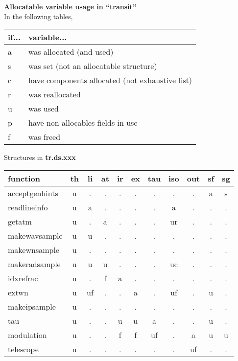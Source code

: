 \documentclass{article}
\begin{document}
\begin{center}
{\large {\bf Allocatable variable usage in ``transit''}}\\
\vfill
In the following tables, \\
\begin{tabular}{ll}
if... & variable...\\
\hline
a & was allocated (and used) \\
s & was set (not an allocatable structure)\\
c & have components allocated (not exhaustive list) \\
r & was reallocated \\
u & was used \\
p & have non-allocables fields in use \\
f & was freed \\
\end{tabular}
\end{center}

\vfill

\begin{center}
{\large Structures in {\bf tr.ds.xxx}}\\[.5cm]
\begin{tabular}{l|cccccccccc}
function
  & th & li & at & ir & ex & tau & iso & out & sf & sg \\
\hline
acceptgenhints
  & u  & .  & .  & .  & .  & .   & .   & .   & a  & s  \\
readlineinfo
  & u  & a  & .  & .  & .  & .   & a   & .   & .  & .  \\
getatm
  & u  & .  & a  & .  & .  & .   & ur  & .   & .  & .  \\
makewavsample
  & u  & u  & .  & .  & .  & .   & .   & .   & .  & .  \\
makewnsample
  & u  & .  & .  & .  & .  & .   & .   & .   & .  & .  \\
makeradsample
  & u  & u  & u  & .  & .  & .   & uc  & .   & .  & .  \\
idxrefrac
  & u  & .  & f  & a  & .  & .   & .   & .   & .  & .  \\
extwn
  & u  & uf & .  & .  & a  & .   & uf  & .   & u  & .  \\
makeipsample
  & u  & .  & .  & .  & .  & .   & .   & .   & .  & .  \\
tau
  & u  & .  & .  & u  & u  & a   & .   & .   & u  & .  \\
modulation
  & u  & .  & .  & f  & f  & uf  & .   & a   & u  & u  \\
telescope
  & u  & .  & .  & .  & .  & .   & .   & uf  & .  & .  \\
\hline
\end{tabular}
\end{center}
\end{document}
